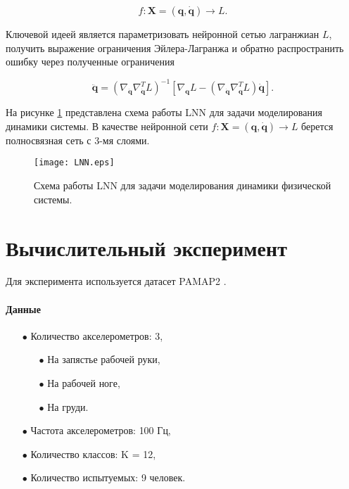 \documentclass[12pt, twoside]{article}
\begin{document}
        $$f: \mathbf{X} = (\mathbf{q}, \mathbf{\dot{q}}) \rightarrow L.$$

        Ключевой идеей является параметризовать нейронной сетью лагранжиан $L$, получить выражение ограничения Эйлера-Лагранжа и обратно распространить ошибку через полученные ограничения
    
        $$\ddot{\mathbf{q}} = \left( \nabla_{\dot{\mathbf{q}}} \nabla_{\dot{\mathbf{q}}}^T L \right)^{-1} \left[ \nabla_{\mathbf{q}} L - \left( \nabla_{\dot{\mathbf{q}}} \nabla_{\mathbf{q}}^T L \right) \dot{\mathbf{q}} \right].$$

        На рисунке \ref{fig: LNN} представлена схема работы LNN для задачи моделирования динамики системы. В качестве нейронной сети $f: \mathbf{X} = (\mathbf{q}, \mathbf{\dot{q}}) \rightarrow L$ берется полносвязная сеть с 3-мя слоями.

        \begin{figure}[H]
            \centering
            \texttt{[image: LNN.eps]}
            \caption{Схема работы LNN для задачи моделирования динамики физической системы.}
            \label{fig: LNN}
        \end{figure}
    
\section{Вычислительный эксперимент}

    Для эксперимента используется датасет PAMAP2 \cite{PAMAP2}.

    \paragraph{Данные}
    
        \begin{itemize}

            \item[$\bullet$] Количество акселерометров: 3,
                    
                    \begin{itemize}

                        \item[$\bullet$] На запястье рабочей руки,

                        \item[$\bullet$] На рабочей ноге,

                        \item[$\bullet$] На груди.

                    \end{itemize}

            \item[$\bullet$] Частота акселерометров: 100 Гц,
            
            \item[$\bullet$] Количество классов: K = 12,

            \item[$\bullet$] Количество испытуемых: 9 человек.

        \end{itemize}
\end{document}
